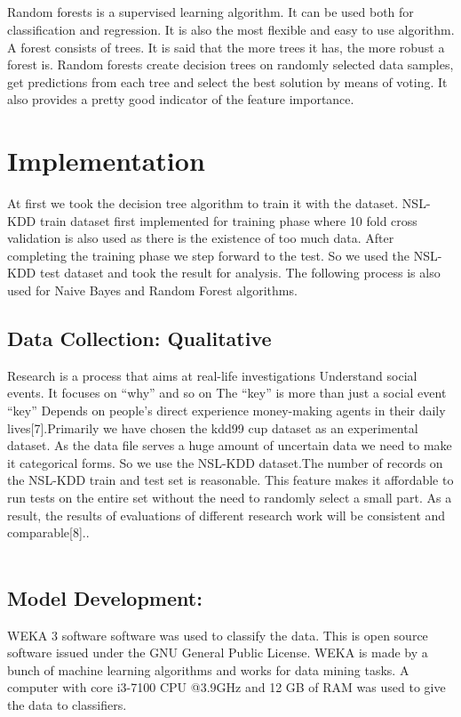 \documentclass[conference]{IEEEtran}
\begin{document}
\subsection{}
 Random forests is a supervised learning algorithm. It can be used both for classification and regression. It is also the most flexible and easy to use algorithm. A forest consists of trees. It is said that the more trees it has, the more robust a forest is. Random forests create decision trees on randomly selected data samples, get predictions from each tree and select the best solution by means of voting. It also provides a pretty good indicator of the feature importance.
 
\section{Implementation}
At first we took the decision tree algorithm to train it with the dataset. NSL-KDD train dataset first implemented for training phase where 10 fold cross validation is also used as there is the existence of too much data. After completing the training phase we step forward to the test. So we used the NSL-KDD test dataset and took the result for analysis. The following process is also used for Naive Bayes and Random Forest algorithms.

\subsection{Data Collection: Qualitative}
 Research is a process that aims at real-life investigations Understand social events. It focuses on “why” and so on The “key” is more than just a social event “key” Depends on people's direct experience money-making agents in their daily lives[7].Primarily we have chosen the kdd99 cup dataset as an experimental dataset. As the data file serves a huge amount of uncertain data we need to make it categorical forms. So we use the NSL-KDD dataset.The number of records on the NSL-KDD train and test set is reasonable. This feature makes it affordable to run tests on the entire set without the need to randomly select a small part. As a result, the results of evaluations of different research work will be consistent and comparable[8]..\\ \\

\subsection{Model Development:}
WEKA 3 software software was used to classify the data. This is open source software issued under the GNU General Public License. WEKA is made by a bunch of machine learning algorithms and works for data mining tasks.
A computer with core i3-7100 CPU @3.9GHz and 12 GB of RAM was used to give the data to classifiers.
\\ \\
\end{document}

